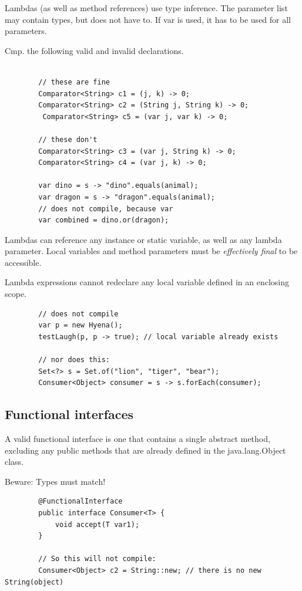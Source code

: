 \documentclass{scrartcl}
\begin{document}
     Lambdas (as well as method references) use type inference. The parameter list may contain types, but does not have to.
     If var is used, it has to be used for all parameters.

     Cmp. the following valid and invalid declarations.

    \begin{lstlisting}

        // these are fine
        Comparator<String> c1 = (j, k) -> 0;
        Comparator<String> c2 = (String j, String k) -> 0;
         Comparator<String> c5 = (var j, var k) -> 0;

        // these don't
        Comparator<String> c3 = (var j, String k) -> 0;
        Comparator<String> c4 = (var j, k) -> 0;

        var dino = s -> "dino".equals(animal);
        var dragon = s -> "dragon".equals(animal);
        // does not compile, because var
        var combined = dino.or(dragon);

    \end{lstlisting}

    Lambdas can reference any instance or static variable, as well as any lambda parameter. Local variables and method parameters must be \textit{effectively final} to be accessible.

    Lambda expressions cannot redeclare any local variable defined in an enclosing scope.

    \begin{lstlisting}
        // does not compile
        var p = new Hyena();
        testLaugh(p, p -> true); // local variable already exists

        // nor does this:
        Set<?> s = Set.of("lion", "tiger", "bear");
        Consumer<Object> consumer = s -> s.forEach(consumer);
    \end{lstlisting}




\subsection{Functional interfaces}

    A valid functional interface is one that contains a single abstract method, excluding any public methods that are already defined in the java.lang.Object class.

    Beware: Types must match!

    \begin{lstlisting}
        @FunctionalInterface
        public interface Consumer<T> {
            void accept(T var1);
        }

        // So this will not compile:
        Consumer<Object> c2 = String::new; // there is no new String(object)
    \end{lstlisting}
\end{document}
